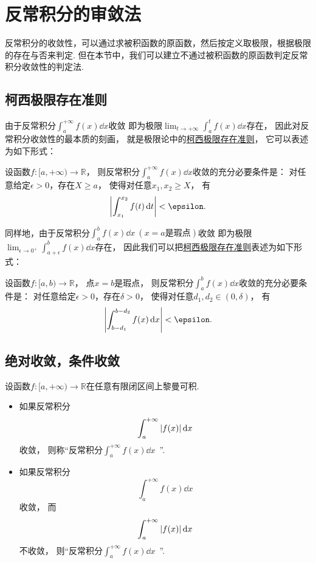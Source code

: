 \section{反常积分的审敛法}
反常积分的收敛性，可以通过求被积函数的原函数，然后按定义取极限，根据极限的存在与否来判定.
但在本节中，我们可以建立不通过被积函数的原函数判定反常积分收敛性的判定法.

\subsection{柯西极限存在准则}
由于反常积分\(\int_a^{+\infty} f(x) \dd{x}\)收敛
即为极限\(\lim_{t\to+\infty} \int_a^t f(x) \dd{x}\)存在，
因此对反常积分收敛性的最本质的刻画，
就是极限论中的\hyperref[theorem:极限.函数的柯西极限存在准则]{柯西极限存在准则}，
它可以表述为如下形式：
\begin{theorem}\label{theorem:反常积分.柯西极限存在准则}
设函数\(f\colon[a,+\infty)\to\mathbb{R}\)，
则反常积分\(\int_a^{+\infty} f(x) \dd{x}\)收敛的充分必要条件是：
对任意给定\(\epsilon>0\)，存在\(X \geq a\)，
使得对任意\(x_1,x_2 \geq X\)，
有\[
	\abs{\int_{x_1}^{x_2} f(t) \dd{t}} < \epsilon.
\]
\end{theorem}

同样地，由于反常积分\(\int_a^b f(x) \dd{x}\ (\text{$x=a$是瑕点})\)收敛
即为极限\(\lim_{\epsilon\to0^+} \int_{a+\epsilon}^b f(x) \dd{x}\)存在，
因此我们可以把\hyperref[theorem:极限.函数的柯西极限存在准则]{柯西极限存在准则}表述为如下形式：
\begin{theorem}
设函数\(f\colon[a,b)\to\mathbb{R}\)，
点\(x=b\)是瑕点，
则反常积分\(\int_a^b f(x) \dd{x}\)收敛的充分必要条件是：
对任意给定\(\epsilon>0\)，存在\(\delta>0\)，
使得对任意\(d_1,d_2\in(0,\delta)\)，
有\[
	\abs{\int_{b-d_1}^{b-d_2} f(x) \dd{x}} < \epsilon.
\]
\end{theorem}

\subsection{绝对收敛，条件收敛}
\begin{definition}
设函数\(f\colon[a,+\infty)\to\mathbb{R}\)在任意有限闭区间上黎曼可积.
\begin{itemize}
	\item 如果反常积分\[
		\int_a^{+\infty} \abs{f(x)} \dd{x}
	\]收敛，
	则称“反常积分\(\int_a^{+\infty} f(x) \dd{x}\)~”.

	\item 如果反常积分\[
		\int_a^{+\infty} f(x) \dd{x}
	\]收敛，
	而\[
		\int_a^{+\infty} \abs{f(x)} \dd{x}
	\]不收敛，
	则“反常积分\(\int_a^{+\infty} f(x) \dd{x}\)~”.
\end{itemize}
\end{definition}

